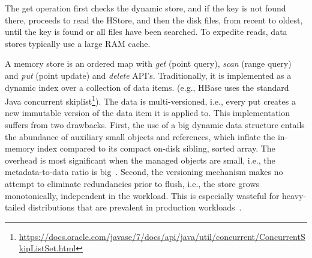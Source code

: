 The get operation first checks the dynamic store, and if the key is not found there, proceeds to read the HStore, and 
then the disk files, from recent to oldest, until the key is found or all files have been searched. 
To expedite reads, data stores typically use a large RAM cache. 



A memory store is an ordered map with {\em get} (point query), {\em scan} (range query) and {\em put} 
(point update) and {\em delete} API's. Traditionally, it is implemented as a dynamic index over a collection of data items. 
(e.g., HBase uses the standard Java concurrent skiplist\footnote{\small{\url{https://docs.oracle.com/javase/7/docs/api/java/util/concurrent/ConcurrentSkipListSet.html}}}).
The data is multi-versioned, i.e., every put creates a new immutable version of the data item it is applied to. 
This implementation suffers from two drawbacks. First, the use of a big dynamic data structure entails 
the abundance of auxiliary small objects and references, which inflate the in-memory index compared 
to its compact on-disk sibling, sorted array. The overhead is most significant when the managed objects
are small, i.e., the metadata-to-data ratio is big~\cite{Wu2015}. Second, the versioning mechanism makes 
no attempt to eliminate redundancies prior to flush, i.e., the store grows monotonically, independent in the workload. 
This is especially wasteful for heavy-tailed distributions that are prevalent in production workloads~\cite{Devineni:2015}.